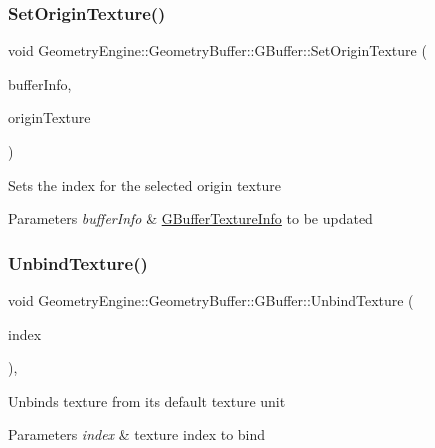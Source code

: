 \subsubsection{\texorpdfstring{SetOriginTexture()}{SetOriginTexture()}}
{\footnotesize\ttfamily void Geometry\+Engine\+::\+Geometry\+Buffer\+::\+G\+Buffer\+::\+Set\+Origin\+Texture (\begin{DoxyParamCaption}\item[{\mbox{\hyperlink{class_geometry_engine_1_1_g_buffer_texture_info}{G\+Buffer\+Texture\+Info}} \&}]{buffer\+Info,  }\item[{const \mbox{\hyperlink{class_geometry_engine_1_1_geometry_buffer_1_1_g_buffer_a718dceafcac1915f7de061108597e1cc}{G\+B\+U\+F\+F\+E\+R\+\_\+\+T\+E\+X\+T\+U\+R\+E\+\_\+\+T\+Y\+PE}} \&}]{origin\+Texture }\end{DoxyParamCaption})}

Sets the index for the selected origin texture 
\begin{DoxyParams}{Parameters}
{\em buffer\+Info} & \mbox{\hyperlink{class_geometry_engine_1_1_g_buffer_texture_info}{G\+Buffer\+Texture\+Info}} to be updated \\
\hline
\end{DoxyParams}
\mbox{\label{class_geometry_engine_1_1_geometry_buffer_1_1_g_buffer_a3034ecd5b07b64a0cb7af24f5c6f80ae}} 
\subsubsection{\texorpdfstring{UnbindTexture()}{UnbindTexture()}\hspace{0.1cm}{\footnotesize\ttfamily [1/4]}}
{\footnotesize\ttfamily void Geometry\+Engine\+::\+Geometry\+Buffer\+::\+G\+Buffer\+::\+Unbind\+Texture (\begin{DoxyParamCaption}\item[{unsigned int}]{index }\end{DoxyParamCaption})\hspace{0.3cm}{\ttfamily [override]}, {\ttfamily [virtual]}}

Unbinds texture from its default texture unit 
\begin{DoxyParams}{Parameters}
{\em index} & texture index to bind \\
\hline
\end{DoxyParams}


